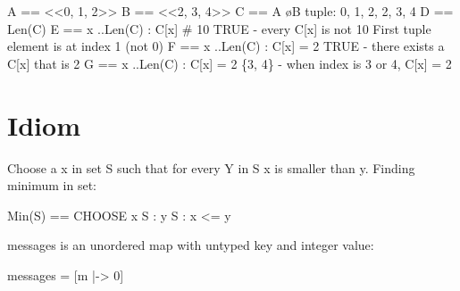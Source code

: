 \documentclass{report}
\begin{document}
\begin{tla}
A == <<0, 1, 2>>                    
B == <<2, 3, 4>>
C == A \o B                         \* tuple: 0, 1, 2, 2, 3, 4
D == Len(C)                         
E == \A x ..Len(C) : C[x] # 10 \* TRUE - every C[x] is not 10
                                    \* First tuple element is at index 1 (not 0)
F == \E x ..Len(C) : C[x] = 2  \* TRUE - there exists a C[x] that is 2
G == {x ..Len(C) : C[x] = 2}   \* \{3, 4\} - when index is 3 or 4, C[x] = 2
\end{tla}
\begin{tlatex}
%
%
%
%
\@xx{}%
%
%
\@xx{}%
%
\@xx{}%
%
%
\@xx{}%
%
\@xx{}%
%
\@xx{}%
\end{tlatex}

\chapter{Idiom}

Choose a x in set S such that for every Y in S x is smaller than y.
Finding minimum in set:\newline
\begin{tla}
    Min(S) == CHOOSE x \in S : \A y \in S : x <= y
\end{tla}
\begin{tlatex}
\end{tlatex}
\newline

messages is an unordered map with untyped key and integer value:\newline

\begin{tla}
messages = [m \in {} |-> 0]
\end{tla}
\end{document}
